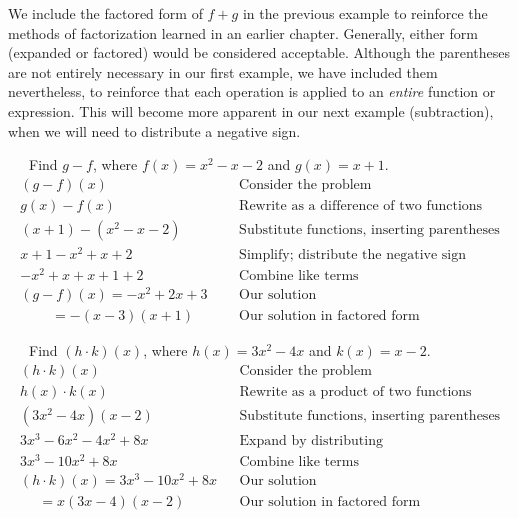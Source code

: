 We include the factored form of $f+g$ in the previous example to reinforce the methods of factorization learned in an earlier chapter.  Generally, either form (expanded or factored) would be considered acceptable.\pp
Although the parentheses are not entirely necessary in our first example, we have included them nevertheless, to reinforce that each operation is applied to an \textit{entire} function or expression.  This will become more apparent in our next example (subtraction), when we will need to distribute a negative sign.
	
\begin{example}~~~Find $g-f$, where $f(x) = x^2 - x - 2$ and $g(x) = x + 1$.
  \begin{eqnarray*}
    (g - f)(x)~~~~~~~~~~ &  & \text{Consider the problem} \\
		g(x) - f(x)~~~~~~~~~ &  & \text{Rewrite~as~a~difference~of~two~functions}\\
		(x + 1)-(x^2 - x - 2)  &  & \text{Substitute~functions,~inserting~parentheses}\\
		x + 1 -x^2 + x + 2~~   &  & \text{Simplify;~distribute~the~negative~sign}\\
		-x^2 + x + x +1 + 2~~ &  & \text{Combine like terms}\\
(g - f)(x)=-x^2 +2x +3~~~ &  & \text{Our solution}\\
    ~~~~~~~~~~=-(x-3)(x+1)&  & \text{Our solution in factored form}
 \end{eqnarray*}
\end{example}
	
\begin{example}~~~Find $(h \cdot k)(x)$, where $h(x) = 3x^2 - 4x$ and $k(x) = x - 2$.
 \begin{eqnarray*}
    (h \cdot k)(x)~~~~~~~~~~ &  & \text{Consider the problem} \\
		h(x)\cdot k(x)~~~~~~~~~ &  & \text{Rewrite~as~a~product~of~two~functions}\\
    (3x^2 - 4x)(x - 2)~~  &  & \text{Substitute~functions,~inserting~parentheses}\\
		3x^3  -6x^2 -4x^2 +8x &  & \text{Expand~by~distributing}\\
		3x^3  -10x^2 + 8x~~~ &  & \text{Combine like terms}\\
    (h \cdot k)(x)=3x^3  -10x^2 + 8x &  & \text{Our solution}\\
    ~~~~~~=x(3x-4)(x-2)&  & \text{Our solution in factored form}
\end{eqnarray*}
\end{example}


